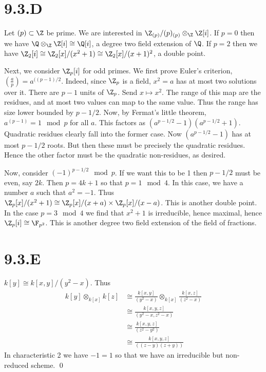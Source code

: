 \documentclass{article}
\begin{document}
\section{9.3.D}
Let $(p) \subset \Z$ be prime. We are interested in
$\Z_{(p)}/(p)_{(p)}
	\otimes_{\Z} \Z[i]$. If $p=0$ then we have
$\Q \otimes_{\Z} \Z[i] \cong
	\Q[i]$, a degree two field extension of
$\Q$. If $p=2$ then we have
$\Z_2[i] \cong \Z_2[x]/(x^2+1) \cong
	\Z_2[x]/(x+1)^2$, a double point.

Next, we consider $\Z_p[i]$ for odd primes. We first prove
Euler's criterion, $(\frac{a}{p})=a^{((p-1)/2}$. Indeed, since
$\Z_p$ is a field, $x^2=a$ has at most two
solutions over it. There are $p-1$ units of
$\Z_p$. Send $x \mapsto x^2$. The range of this map
are the residues, and at most two values can map to the same value. Thus the
range has size lower bounded by $p-1/2$. Now, by Fermat's
little theorem, $a^(p-1)=1 \mod p$ for all $a$. This
factors as $(a^{p-1/2}-1)(a^{p-1/2}+1)$. Quadratic residues clearly fall into the
former case. Now $(a^{p-1/2}-1)$ has at most $p-1/2$
roots. But then these must be precisely the quadratic residues. Hence the other
factor must be the quadratic non-residues, as desired.

Now, consider $(-1)^{p-1/2} \mod p$. If we want this to be 1 then
$p-1/2$ must be even, say $2k$. Then
$p=4k+1$ so that $p = 1 \mod 4$. In this case, we have
a number $a$ such that $a^2=-1$. Thus
$\Z_p[x]/(x^2+1) \cong \Z_p[x]/(x+a) \times
	\Z_p[x]/(x-a)$. This is another double point. In the case
$p=3 \mod 4$ we find that $x^2+1$ is irreducible,
hence maximal, hence $\Z_p[i] \cong \F_{p^2}$. This is another degree two field
extension of the field of fractions.

\section{9.3.E}
$k[y] \cong k[x, y]/(y^2-x)$. Thus
\begin{align*}
	k[y] \otimes_{k[x]} k[z] & \cong \frac{k[x,y]}{(y^2-x)} \otimes_{k[x]} \frac{k[x,z]}{(z^2-x)} \\
	                         & \cong \frac{k[x,y,z]}{(y^2-x, z^2-x)}                              \\
	                         & \cong \frac{k[x,y,z]}{(z^2-y^2)}                                   \\
	                         & \cong \frac{k[x,y,z]}{((z-y)(z+y))}
\end{align*}
In characteristic 2 we have $-1=1$ so that we have an
irreducible but non-reduced scheme. \qed
\end{document}
